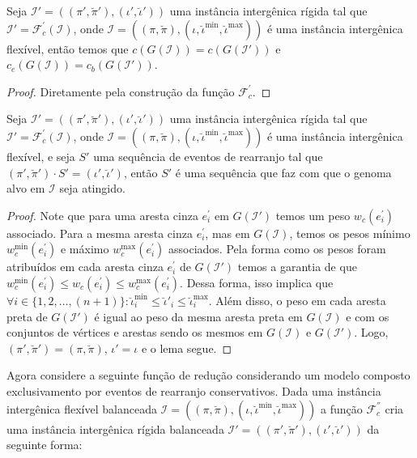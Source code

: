 

\begin{lemma}\label{lemma:AOKHMVAY}
Seja $\mathcal{I'} = ((\pi',\breve\pi'),(\iota',\breve\iota'))$ uma instância intergênica rígida tal que $\mathcal{I'} = \mathcal{F}_{c}^{'}(\mathcal{I})$, onde $\mathcal{I} = ((\pi,\breve\pi),(\iota,\breve\iota^{\min},\breve\iota^{\max}))$ é uma instância intergênica flexível, então temos que $c(G(\mathcal{I})) = c(G(\mathcal{I}'))$ e $c_e(G(\mathcal{I})) = c_b(G(\mathcal{I}'))$.
\end{lemma}
\begin{proof}
Diretamente pela construção da função $\mathcal{F}_{c}^{'}$.
\end{proof}

\begin{lemma}\label{lemma:TQUNQUGX}
Seja $\mathcal{I'} = ((\pi',\breve\pi'),(\iota',\breve\iota'))$ uma instância intergênica rígida tal que $\mathcal{I'} = \mathcal{F}_{c}^{'}(\mathcal{I})$, onde $\mathcal{I} = ((\pi,\breve\pi),(\iota,\breve\iota^{\min},\breve\iota^{\max}))$ é uma instância intergênica flexível, e seja $S'$ uma sequência de eventos de rearranjo tal que $(\pi',\breve\pi') \cdot S' = (\iota',\breve\iota')$, então $S'$ é uma sequência que faz com que o genoma alvo em $\mathcal{I}$ seja atingido.
\end{lemma}
\begin{proof}
Note que para uma aresta cinza $e^{\prime}_i$ em $G(\mathcal{I}')$ temos um peso $w_c(e^{\prime}_i)$ associado. Para a mesma aresta cinza $e^{\prime}_i$, mas em $G(\mathcal{I})$, temos os pesos mínimo $w^{\min}_c(e^{\prime}_i)$ e máximo $w^{\max}_c(e^{\prime}_i)$ associados. Pela forma como os pesos foram atribuídos em cada aresta cinza $e^{\prime}_i$ de $G(\mathcal{I}')$ temos a garantia de que $w^{\min}_c(e^{\prime}_i) \le w_c(e^{\prime}_i) \le w^{\max}_c(e^{\prime}_i)$. Dessa forma, isso implica que $\forall i \in \{1,2,\dots,({n+1})\}: \breve\iota^{\min}_i \le \breve\iota'_i \le \breve\iota^{\max}_i$. Além disso, o peso em cada aresta preta de $G(\mathcal{I}')$ é igual ao peso da mesma aresta preta em $G(\mathcal{I})$ e com os conjuntos de vértices e arestas sendo os mesmos em $G(\mathcal{I})$ e $G(\mathcal{I}')$. Logo, $(\pi',\breve\pi') = (\pi,\breve\pi)$, $\iota' = \iota$ e o lema segue.
\end{proof}

Agora considere a seguinte função de redução considerando um modelo composto exclusivamento por eventos de rearranjo conservativos. Dada uma instância intergênica flexível balanceada $\mathcal{I} = ((\pi,\breve\pi),(\iota,\breve\iota^{\min},\breve\iota^{\max}))$ a função $\mathcal{F}_{c}^{''}$ cria uma instância intergênica rígida balanceada $\mathcal{I'} = ((\pi',\breve\pi'),(\iota',\breve\iota'))$ da seguinte forma:


